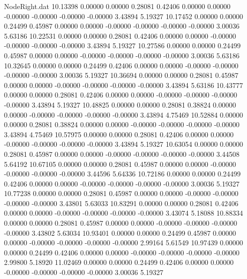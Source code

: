 \begin{filecontents}{NodeRight.dat}
  10.13398    0.00000    0.00000     0.28081    0.42406    0.00000    0.00000   -0.00000   -0.00000   -0.00000   -0.00000    3.43894    5.19327
  10.17452    0.00000    0.00000     0.24499    0.45987    0.00000    0.00000   -0.00000   -0.00000   -0.00000   -0.00000    3.00036    5.63186
  10.22531    0.00000    0.00000     0.28081    0.42406    0.00000    0.00000   -0.00000   -0.00000   -0.00000   -0.00000    3.43894    5.19327
  10.27586    0.00000    0.00000     0.24499    0.45987    0.00000    0.00000   -0.00000   -0.00000   -0.00000   -0.00000    3.00036    5.63186
  10.32645    0.00000    0.00000     0.24499    0.42406    0.00000    0.00000   -0.00000   -0.00000   -0.00000   -0.00000    3.00036    5.19327
  10.36694    0.00000    0.00000     0.28081    0.45987    0.00000    0.00000   -0.00000   -0.00000   -0.00000   -0.00000    3.43894    5.63186
  10.43777    0.00000    0.00000     0.28081    0.42406    0.00000    0.00000   -0.00000   -0.00000   -0.00000   -0.00000    3.43894    5.19327
  10.48825    0.00000    0.00000     0.28081    0.38824    0.00000    0.00000   -0.00000   -0.00000   -0.00000   -0.00000    3.43894    4.75469
  10.52884    0.00000    0.00000     0.28081    0.38824    0.00000    0.00000   -0.00000   -0.00000   -0.00000   -0.00000    3.43894    4.75469
  10.57975    0.00000    0.00000     0.28081    0.42406    0.00000    0.00000   -0.00000   -0.00000   -0.00000   -0.00000    3.43894    5.19327
  10.63054    0.00000    0.00000     0.28081    0.45987    0.00000    0.00000   -0.00000   -0.00000   -0.00000   -0.00000    3.44508    5.64192
  10.67105    0.00000    0.00000     0.28081    0.45987    0.00000    0.00000   -0.00000   -0.00000   -0.00000   -0.00000    3.44596    5.64336
  10.72186    0.00000    0.00000     0.24499    0.42406    0.00000    0.00000   -0.00000   -0.00000   -0.00000   -0.00000    3.00036    5.19327
  10.77238    0.00000    0.00000     0.28081    0.45987    0.00000    0.00000   -0.00000   -0.00000   -0.00000   -0.00000    3.43801    5.63033
  10.83291    0.00000    0.00000     0.28081    0.42406    0.00000    0.00000   -0.00000   -0.00000   -0.00000   -0.00000    3.43074    5.18088
  10.88334    0.00000    0.00000     0.28081    0.45987    0.00000    0.00000   -0.00000   -0.00000   -0.00000   -0.00000    3.43802    5.63034
  10.93401    0.00000    0.00000     0.24499    0.45987    0.00000    0.00000   -0.00000   -0.00000   -0.00000   -0.00000    2.99164    5.61549
  10.97439    0.00000    0.00000     0.24499    0.42406    0.00000    0.00000   -0.00000   -0.00000   -0.00000   -0.00000    2.99800    5.18920
  11.02469    0.00000    0.00000     0.24499    0.42406    0.00000    0.00000   -0.00000   -0.00000   -0.00000   -0.00000    3.00036    5.19327

\end{filecontents}

